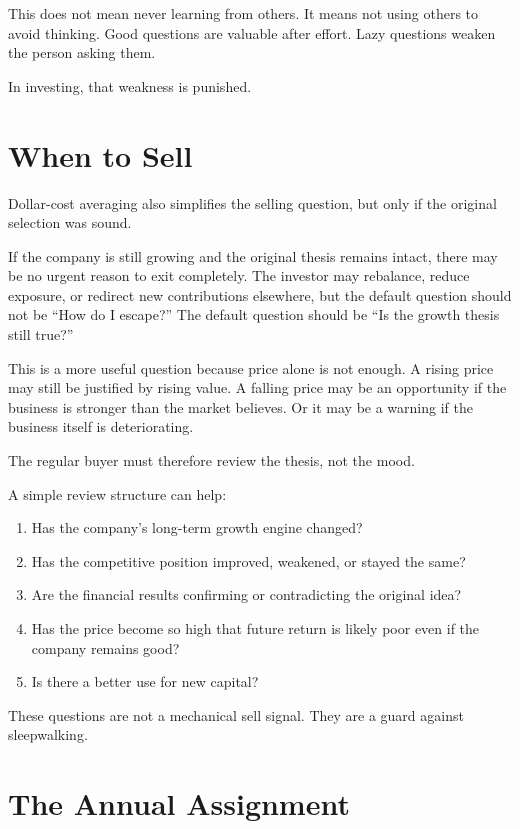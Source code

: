 This does not mean never learning from others. It means not using others to avoid thinking. Good questions are valuable after effort. Lazy questions weaken the person asking them.

In investing, that weakness is punished.

\section*{When to Sell}

Dollar-cost averaging also simplifies the selling question, but only if the original selection was sound.

If the company is still growing and the original thesis remains intact, there may be no urgent reason to exit completely. The investor may rebalance, reduce exposure, or redirect new contributions elsewhere, but the default question should not be ``How do I escape?'' The default question should be ``Is the growth thesis still true?''

This is a more useful question because price alone is not enough. A rising price may still be justified by rising value. A falling price may be an opportunity if the business is stronger than the market believes. Or it may be a warning if the business itself is deteriorating.

The regular buyer must therefore review the thesis, not the mood.

A simple review structure can help:

\begin{enumerate}
\item Has the company's long-term growth engine changed?
\item Has the competitive position improved, weakened, or stayed the same?
\item Are the financial results confirming or contradicting the original idea?
\item Has the price become so high that future return is likely poor even if the company remains good?
\item Is there a better use for new capital?
\end{enumerate}

These questions are not a mechanical sell signal. They are a guard against sleepwalking.

\section*{The Annual Assignment}

